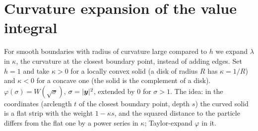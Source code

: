 \section{Curvature expansion of the value integral}\label{sec:curv}

For smooth boundaries with radius of curvature large compared to $h$ we expand $\lambda$ in $\kappa$, the
curvature at the closest boundary point, instead of adding edges. Set $h=1$ and take $\kappa>0$ for a locally convex solid
(a disk of radius $R$ has $\kappa=1/R$) and $\kappa<0$ for a concave one (the solid is the complement of a disk).
$\varphi(\sigma)=W(\sqrt\sigma)$, $\sigma=|\bm y|^2$, extended by $0$ for $\sigma>1$. The idea: in the coordinates
(arclength $t$ of the closest boundary point, depth $s$) the curved solid is a flat strip with the weight $1-\kappa s$,
and the squared distance to the particle differs from the flat one by a power series in $\kappa$; Taylor-expand $\varphi$ in it.


